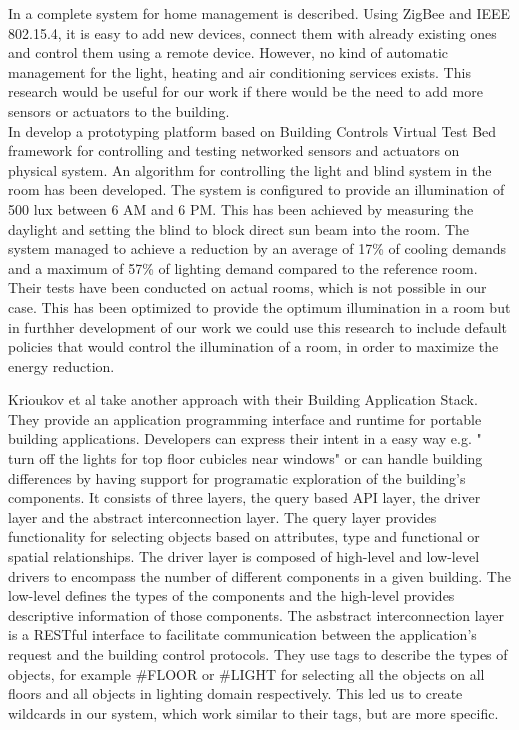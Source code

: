 In \cite{Han10} a complete system for home management is described. Using ZigBee and IEEE 802.15.4, it is easy to add new devices, connect them with already existing ones and control them using a remote device. However, no kind of automatic management for the light, heating and air conditioning services exists. This research would be useful for our work if there would be the need to add more sensors or actuators to the building.
\\In \cite{Wen11} develop a prototyping platform based on Building Controls Virtual Test Bed framework \cite{Bcvtb} for controlling and testing networked sensors and actuators on physical system. An algorithm for controlling the light and blind system in the room has been developed. The system is configured to provide an illumination of 500 lux between 6 AM and 6 PM. This has been achieved by measuring the daylight and setting the blind to block direct sun beam into the room. The system managed to achieve a reduction by an average of 17\% of cooling demands and a maximum of 57\% of lighting demand compared to the reference room. Their tests have been conducted on actual rooms, which is not possible in our case. This has been optimized to provide the optimum illumination in a room but in furthher development of our work we could use this research to include default policies that would control the illumination of a room, in order to maximize the energy reduction. 

Krioukov et al \cite{Krioukov12} take another approach with their Building Application Stack. They provide an application programming interface and runtime for portable building applications. Developers can express their intent in a easy way e.g. " turn off the lights
for top floor cubicles near windows" or can handle building differences by having support for programatic exploration of the building's components. It consists of three layers, the query based API layer, the driver layer and the abstract interconnection layer. 
The query layer provides functionality for selecting objects based on attributes, type and functional or spatial relationships. The driver layer is composed of high-level and low-level drivers to encompass the number of different components in a given building. The low-level defines the types of the components and the high-level provides descriptive information of those components. The asbstract interconnection layer is a RESTful interface to facilitate communication between the application's request and the building control protocols. They use tags to describe the types of objects, for example #FLOOR or #LIGHT for selecting all the objects on all floors and all objects in lighting domain respectively. This led us to create wildcards in our system, which work similar to their tags, but are more specific.  

